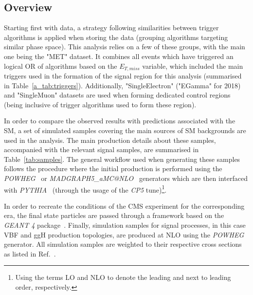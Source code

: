 \subsection{Overview}
\hspace{10pt} Starting first with data, a strategy following similarities between trigger algorithms is applied when storing the data (grouping algorithms targeting similar phase space). This analysis relies on a few of these groups, with the main one being the "MET" dataset. It combines all events which have triggered an logical OR of algorithms based on the $E_{T,miss}$ variable, which included the main triggers used in the formation of the signal region for this analysis (summarised in Table~\ref{a_tab:triggers}). Additionally, "SingleElectron" ("EGamma" for 2018) and "SingleMuon" datasets are used when forming dedicated control regions (being inclusive of trigger algorithms used to form these region).

\hspace{10pt} In order to compare the observed results with predictions associated with the SM, a set of simulated samples covering the main sources of SM backgrounds are used in the analysis. The main production details about these samples, accompanied with the relevant signal samples, are summarised in Table~\ref{tab:samples}. The general workflow used when generating these samples follows the procedure where the initial production is performed using the \emph{POWHEG}~\cite{powheg} or \emph{MADGRAPH5\_aMC@NLO}~\cite{madgraph} generators which are then interfaced with \emph{PYTHIA}~\cite{pythia} (through the usage of the \emph{CP5} tune)\footnote{Using the terms LO and NLO to denote the leading and next to leading order, respectively.}. 

\hspace{10pt} In order to recreate the conditions of the CMS experiment for the corresponding era, the final state particles are passed through a framework based on the \emph{GEANT 4} package~\cite{geant4}. Finally, simulation samples for signal processes, in this case VBF and ggH production topologies, are produced at NLO using the \emph{POWHEG} generator. All simulation samples are weighted to their respective cross sections as listed in Ref.~\cite{note:AN_19_257}.

